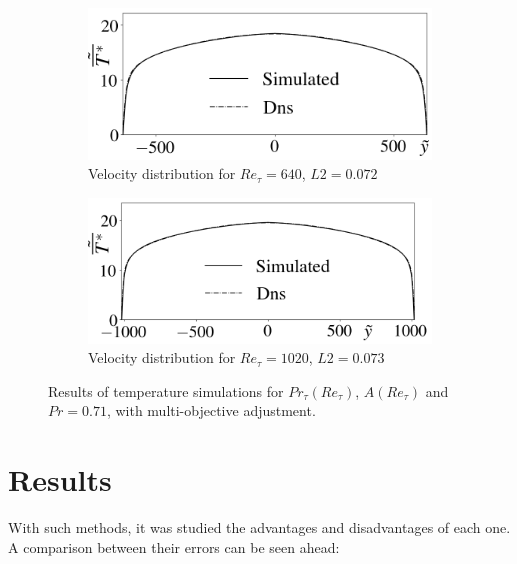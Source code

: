 \documentclass[10pt]{article} %
\begin{document}
\begin{figure}[!h]
\begin{subfigure}[t]{0.5\textwidth}
		\centering
		\includegraphics[angle=0, scale=0.24]{fotos_formatacao_final/Temperature_640_071_Genetic}
		\caption{Velocity distribution for $Re_\tau = 640$, $L2 = 0.072$}
	\end{subfigure}
	\begin{subfigure}[t]{0.45\textwidth}
		\centering
		\includegraphics[angle=0, scale=0.24]{fotos_formatacao_final/Temperature_1000_071_Genetic}
		\caption{Velocity distribution for $Re_\tau = 1020$, $L2 = 0.073$}
	\end{subfigure}	
	\caption{Results of temperature simulations for $Pr_\tau(Re_\tau)$, $A(Re_\tau)$ and $Pr =0.71$, with multi-objective adjustment.}
\end{figure}





 
\section{Results}

With such methods, it was studied the advantages and disadvantages of each one. A comparison between their errors can be seen ahead:\\
\end{document}

